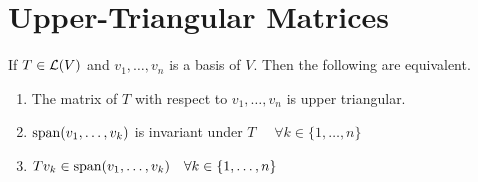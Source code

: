 \section{Upper-Triangular Matrices}

\setcounter{thm}{38}
\begin{thm} 
  \label{conditions for upper-triangular matrix}
  If $T \in \mathcal{L} (V)$ and $v_1, \dots, v_n$ is a basis of $V$. Then the following are equivalent.
  \begin{enumerate}[label=\textbf{(\alph*)}]
    \item The matrix of $T$ with respect to $v_1, \dots, v_n$ is upper triangular.
    \item $\operatorname{span} (v_1, \dots, v_k)$ is invariant under $T$ $\quad \forall k \in \{ 1, \dots, n\}$
    \item $T v_k \in \operatorname{span} (v_1, \dots, v_k) \quad \forall k \in \{1, \dots, n\}$
  \end{enumerate}
\end{thm}
